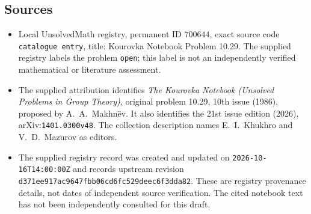 \documentclass[11pt]{article}
\begin{document}
\subsection{Sources}
\begin{itemize}
\item Local UnsolvedMath registry, permanent ID \(700644\), exact source code \texttt{catalogue entry}, title: Kourovka Notebook Problem 10.29. The supplied registry labels the problem \texttt{open}; this label is not an independently verified mathematical or literature assessment.
\item The supplied attribution identifies \emph{The Kourovka Notebook (Unsolved Problems in Group Theory)}, original problem 10.29, 10th issue (1986), proposed by A.\ A.\ Makhn\"ev. It also identifies the 21st issue edition (2026), arXiv:\texttt{1401.0300v48}. The collection description names E.\ I.\ Khukhro and V.\ D.\ Mazurov as editors.
\item The supplied registry record was created and updated on \texttt{2026-10-16T14:00:00Z} and records upstream revision \texttt{d371ee917ac9647fbb06cd6fc529deec6f3dda82}. These are registry provenance details, not dates of independent source verification. The cited notebook text has not been independently consulted for this draft.
\end{itemize}
\end{document}
